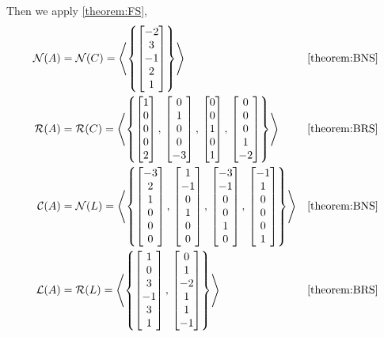\documentclass{ximera}
\begin{document}
\begin{example}
  Then we apply \ref{theorem:FS},
  \begin{align*}
    \nsp{A}&=\nsp{C}=
             \spn{\set{
             \colvector{-2\\3\\-1\\2\\1}
    }}
           &&\ref{theorem:BNS}\\
    \rsp{A}&=\rsp{C}=
             \spn{\set{
             \colvector{1 \\ 0 \\ 0 \\ 0 \\ 2},\,
    \colvector{0 \\ 1 \\ 0 \\ 0 \\ -3},\,
    \colvector{0 \\ 0 \\ 1 \\ 0 \\ 1},\,
    \colvector{0 \\ 0 \\ 0 \\ 1 \\ -2}
    }}
           &&\ref{theorem:BRS}\\
    \csp{A}&=\nsp{L}=
             \spn{\set{
             \colvector{-3\\2\\1\\0\\0\\0},\,
    \colvector{1\\-1\\0\\1\\0\\0},\,
    \colvector{-3\\-1\\0\\0\\1\\0},\,
    \colvector{-1\\1\\0\\0\\0\\1}
    }}
           &&\ref{theorem:BNS}\\
    \lns{A}&=\rsp{L}=
             \spn{\set{
             \colvector{1 \\ 0 \\ 3 \\ -1 \\ 3 \\ 1},\,
    \colvector{0 \\ 1 \\ -2 \\ 1 \\ 1 \\ -1}
    }}
           &&\ref{theorem:BRS}
  \end{align*}
\end{example}
\end{document}
